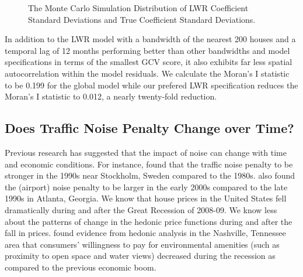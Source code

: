 \documentclass{article}\usepackage{graphicx, color}
\begin{document}
\begin{figure}
 \caption{The Monte Carlo Simulation Distribution of LWR Coefficient Standard Deviations and True Coefficient Standard Deviations.}\label{fig:MCsds}
\end{figure}
 
In addition to the LWR model with a bandwidth of the nearest 200 houses and a temporal lag of 12 months performing better than other bandwidths and model specifications in terms of the smallest GCV score, it also exhibits far less spatial autocorrelation within the model residuals. We calculate the Moran’s I statistic to be 0.199 for the global model while our prefered LWR specification reduces the Moran's I statistic to 0.012, a nearly twenty-fold reduction. 

\subsection{Does Traffic Noise Penalty Change over Time?}

Previous research has suggested that the impact of noise can change with time and economic conditions. For instance, \citet{Wilhelmsson2000} found that the traffic noise penalty to be stronger in the 1990s near Stockholm, Sweden compared to the 1980s. \citet{Cohen2009} also found the (airport) noise penalty to be larger in the early 2000s compared to the late 1990s in Atlanta, Georgia. We know that house prices in the United States fell dramatically during and after the Great Recession of 2008-09. We know less about the patterns of change in the hedonic price functions during and after the fall in prices. \citet{Cho2011b} found evidence from hedonic analysis in the Nashville, Tennessee area that consumers' willingness to pay for environmental amenities (such as proximity to open space and water views) decreased during the recession as compared to the previous economic boom. 
\end{document}
